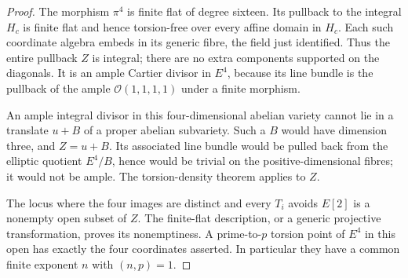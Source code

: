 \begin{proof}
The morphism $\pi^4$ is finite flat of degree sixteen. Its
pullback to the integral $H_c$ is finite flat and hence
torsion-free over every affine domain in $H_c$. Each such
coordinate algebra embeds in its generic fibre, the field
just identified. Thus the entire pullback $Z$ is integral;
there are no extra components supported on the diagonals.
It is an ample Cartier divisor in $E^4$, because its line
bundle is the pullback of the ample
$\mathcal O(1,1,1,1)$ under a finite morphism.

An ample integral divisor in this four-dimensional abelian
variety cannot lie in a translate $u+B$ of a proper abelian
subvariety. Such a $B$ would have dimension three, and
$Z=u+B$. Its associated line bundle would be pulled back
from the elliptic quotient $E^4/B$, hence would be trivial
on the positive-dimensional fibres; it would not be ample.
The torsion-density theorem applies to $Z$.

The locus where the four images are distinct and every
$T_i$ avoids $E[2]$ is a nonempty open subset of $Z$. The
finite-flat description, or a generic projective
transformation, proves its nonemptiness. A prime-to-$p$
torsion point of $E^4$ in this open has exactly the four
coordinates asserted. In particular they have a common
finite exponent $n$ with $(n,p)=1$.
\end{proof}

